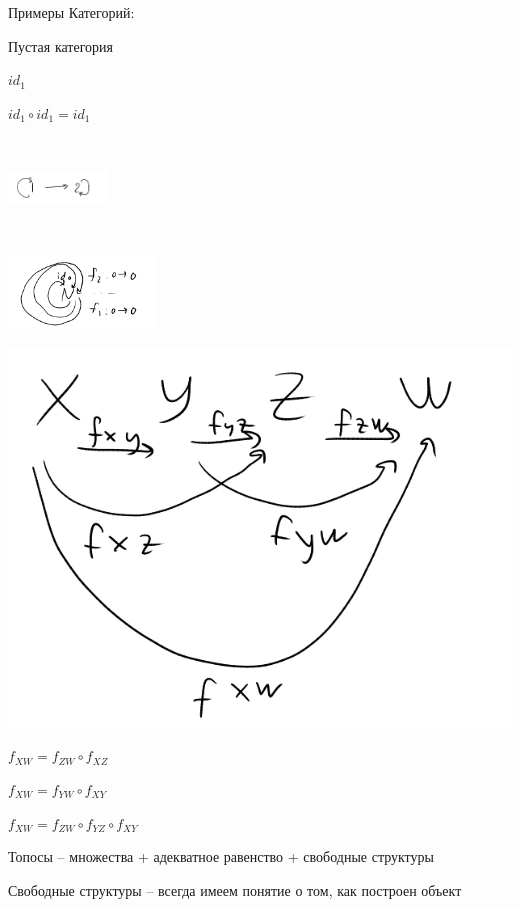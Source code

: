 \documentclass[../main.tex]{subfiles}
\begin{document}
	Примеры Категорий:
	\begin{mylist}
		\item Пустая категория
		\item $id_1$
		
		$id_1 \circ id_1 = id_1$
		\item \
		
		\includegraphics[width=100px]{3кат}
		\item \
		
		\includegraphics[width=150px]{4кат}
	\end{mylist}
	\begin{minipage}{\textwidth/2}
			\includegraphics[width=\textwidth]{3}
	\end{minipage}
	\begin{minipage}{\textwidth/2}
		$f_{XW} = f_{ZW} \circ f_{XZ}$
		
		$f_{XW} = f_{YW} \circ f_{XY}$
		
		$f_{XW} = f_{ZW} \circ f_{YZ} \circ f_{XY}$
	\end{minipage}
	
	\begin{defin}
		Топосы -- множества + адекватное равенство + свободные структуры
	\end{defin}
	Свободные структуры -- всегда имеем понятие о том, как построен объект
	
\end{document}
